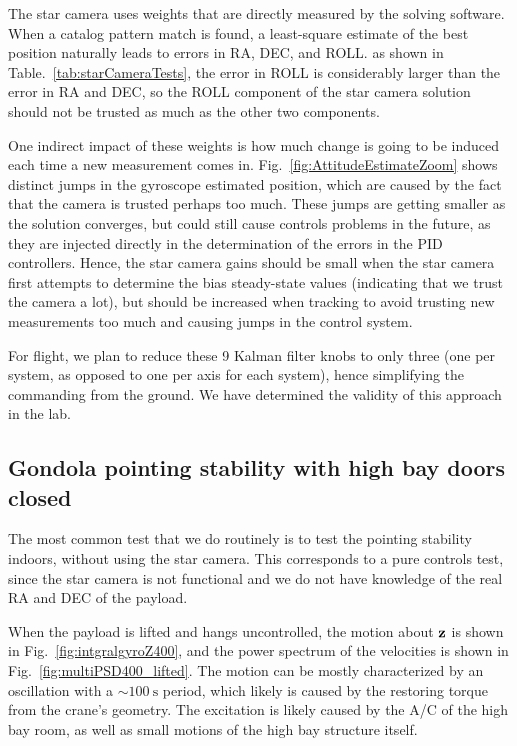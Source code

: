 The star camera uses weights that are directly measured by the solving software. When a catalog pattern match is found, a least-square estimate of the best position naturally leads to errors in RA, DEC, and ROLL. as shown in Table.~\ref{tab:starCameraTests}, the error in ROLL is considerably larger than the error in RA and DEC, so the ROLL component of the star camera solution should not be trusted as much as the other two components. 

One indirect impact of these weights is how much change is going to be induced each time a new measurement comes in. Fig.~\ref{fig:AttitudeEstimateZoom} shows distinct jumps in the gyroscope estimated position, which are caused by the fact that the camera is trusted perhaps too much. These jumps are getting smaller as the solution converges, but could still cause controls problems in the future, as they are injected directly in the determination of the errors in the PID controllers. Hence, the star camera gains should be small when the star camera first attempts to determine the bias steady-state values (indicating that we trust the camera a lot), but should be increased when tracking to avoid trusting new measurements too much and causing jumps in the control system. 

For flight, we plan to reduce these 9 Kalman filter knobs to only three (one per system, as opposed to one per axis for each system), hence simplifying the commanding from the ground. We have determined the validity of this approach in the lab.

\subsection{Gondola pointing stability with high bay doors closed}

The most common test that we do routinely is to test the pointing stability indoors, without using the star camera. This corresponds to a pure controls test, since the star camera is not functional and we do not have knowledge of the real RA and DEC of the payload. 

When the payload is lifted and hangs uncontrolled, the motion about $\textrm{\textbf{z}}$ is shown in Fig.~\ref{fig:intgralgyroZ400}, and the power spectrum of the velocities is shown in Fig.~\ref{fig:multiPSD400_lifted}. The motion can be mostly characterized by an oscillation with a $\sim\SI{100}{\second}$ period, which likely is caused by the restoring torque from the crane's geometry. The excitation is likely caused by the A/C of the high bay room, as well as small motions of the high bay structure itself.

